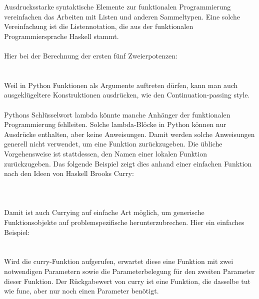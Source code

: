 Ausdrucksstarke syntaktische Elemente zur funktionalen Programmierung vereinfachen das Arbeiten mit Listen und anderen Sammeltypen. Eine solche Vereinfachung ist die Listennotation, die aus der funktionalen Programmiersprache Haskell stammt.\\
\\
Hier bei der Berechnung der ersten fünf Zweierpotenzen:
\ \\
\\
\\
Weil in Python Funktionen als Argumente auftreten dürfen, kann man auch ausgeklügeltere Konstruktionen ausdrücken, wie den Continuation-passing style.\\
\\
Pythons Schlüsselwort lambda könnte manche Anhänger der funktionalen Programmierung fehlleiten. Solche lambda-Blöcke in Python können nur Ausdrücke enthalten, aber keine Anweisungen. Damit werden solche Anweisungen generell nicht verwendet, um eine Funktion zurückzugeben. Die übliche Vorgehensweise ist stattdessen, den Namen einer lokalen Funktion zurückzugeben. Das folgende Beispiel zeigt dies anhand einer einfachen Funktion nach den Ideen von Haskell Brooks Curry:\\
\\
\\
\\
Damit ist auch Currying auf einfache Art möglich, um generische Funktionsobjekte auf problemspezifische herunterzubrechen. Hier ein einfaches Beispiel:\\
\\
\\
Wird die curry-Funktion aufgerufen, erwartet diese eine Funktion mit zwei notwendigen Parametern sowie die Parameterbelegung für den zweiten Parameter dieser Funktion. Der Rückgabewert von curry ist eine Funktion, die dasselbe tut wie func, aber nur noch einen Parameter benötigt.\\

